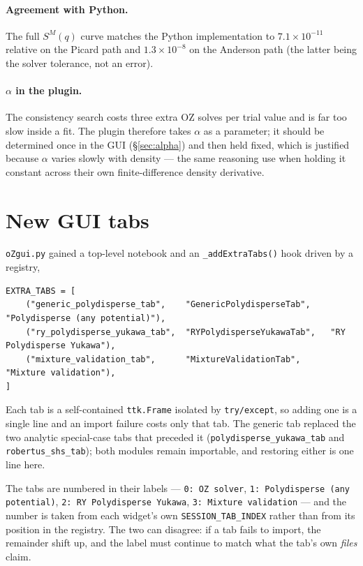 \documentclass[11pt,a4paper]{article}
\newcommand{\code}[1]{\texttt{\hspace{0pt}#1}}
\begin{document}
\paragraph{Agreement with Python.} The full $S^M(q)$ curve matches the Python
implementation to $7.1\times10^{-11}$ relative on the Picard path and
$1.3\times10^{-8}$ on the Anderson path (the latter being the solver
tolerance, not an error).

\paragraph{$\alpha$ in the plugin.} The consistency search costs three extra
OZ solves per trial value and is far too slow inside a fit. The plugin
therefore takes $\alpha$ as a parameter; it should be determined once in the
GUI (\S\ref{sec:alpha}) and then held fixed, which is justified because
$\alpha$ varies slowly with density --- the same reasoning
\cite{DAguannoKlein1991} use when holding it constant across their own
finite-difference density derivative.

\section{New GUI tabs}

\code{oZgui.py} gained a top-level notebook and an \code{\_addExtraTabs()}
hook driven by a registry,
\begin{lstlisting}[basicstyle=\ttfamily\footnotesize]
EXTRA_TABS = [
    ("generic_polydisperse_tab",    "GenericPolydisperseTab",    "Polydisperse (any potential)"),
    ("ry_polydisperse_yukawa_tab",  "RYPolydisperseYukawaTab",   "RY Polydisperse Yukawa"),
    ("mixture_validation_tab",      "MixtureValidationTab",      "Mixture validation"),
]
\end{lstlisting}
Each tab is a self-contained \code{ttk.Frame} isolated by \code{try/except},
so adding one is a single line and an import failure costs only that tab. The
generic tab replaced the two analytic special-case tabs that preceded it
(\code{polydisperse\_yukawa\_tab} and \code{robertus\_shs\_tab}); both modules
remain importable, and restoring either is one line here.

The tabs are numbered in their labels --- \code{0: OZ solver},
\code{1: Polydisperse (any potential)}, \code{2: RY Polydisperse Yukawa},
\code{3: Mixture validation} --- and the number is taken from each widget's
own \code{SESSION\_TAB\_INDEX} rather than from its position in the registry.
The two can disagree: if a tab fails to import, the remainder shift up, and
the label must continue to match what the tab's own \emph{files} claim.
\end{document}
